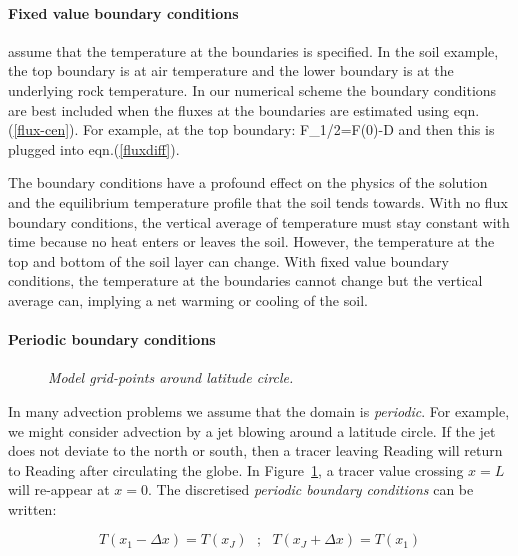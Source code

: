 \paragraph{Fixed value boundary conditions} 

assume that the temperature at the boundaries is specified. In the
soil example, the top boundary is at air temperature and the lower
boundary is at the underlying rock temperature. In our numerical
scheme the boundary conditions are best included when the fluxes at
the boundaries are estimated using eqn.(\ref{flux-cen}). For example,
at the top boundary:
\BEQ
F_{1/2}=F(0)\approx -D 
\EEQ
and then this is plugged into eqn.(\ref{fluxdiff}).

The boundary conditions have a profound effect on the physics of the
solution and the equilibrium temperature profile that the soil tends
towards. With no flux boundary conditions, the vertical average of
temperature must stay constant with time because no heat enters or
leaves the soil. However, the temperature at the top and bottom of the
soil layer can change. With fixed value boundary conditions, the
temperature at the boundaries cannot change but the vertical average
can, implying a net warming or cooling of the soil.

\paragraph{Periodic boundary conditions}

\begin{figure}
	\begin{center}
	\end{center}
	\caption{\textsl{Model grid-points around latitude circle.}}
	\label{adv-grid}
\end{figure}

In many advection problems we assume that the domain is {\em
	periodic}. For example, we might consider advection by a jet blowing
around a latitude circle. If the jet does not deviate to the north or
south, then a tracer leaving Reading will return to Reading after
circulating the globe. In Figure~\ref{adv-grid}, a tracer value crossing $x=L$
will re-appear at $x=0$. The discretised {\em periodic boundary
	conditions} can be written:

\begin{equation}
	T(x_1-\Delta x)=T(x_J)~~~ ; ~~~T(x_J+\Delta x)=T(x_1)
\end{equation}


